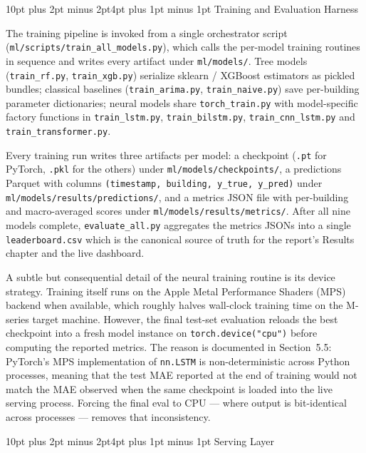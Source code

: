 \documentclass[12pt,a4paper,openany]{report}
\makeatletter
\renewcommand{\section}{\@startsection{section}{1}{\z@}%
  {10pt plus 2pt minus 2pt}{4pt plus 1pt minus 1pt}%
  {\normalfont\normalsize\bfseries}}
\makeatother
\begin{document}
\section{Training and Evaluation Harness}

The training pipeline is invoked from a single orchestrator script (\texttt{ml/scripts/}\allowbreak\texttt{train\_all\_models.py}), which calls the per-model training routines in sequence and writes every artifact under \texttt{ml/models/}. Tree models (\texttt{train\_rf.py}, \texttt{train\_xgb.py}) serialize sklearn / XGBoost estimators as pickled bundles; classical baselines (\texttt{train\_arima.py}, \texttt{train\_naive.py}) save per-building parameter dictionaries; neural models share \texttt{torch\_train.py} with model-specific factory functions in \texttt{train\_lstm.py}, \texttt{train\_bilstm.py}, \texttt{train\_cnn\_lstm.py} and \texttt{train\_transformer.py}.

Every training run writes three artifacts per model: a checkpoint (\texttt{.pt} for PyTorch, \texttt{.pkl} for the others) under \texttt{ml/models/checkpoints/}, a predictions Parquet with columns \texttt{(timestamp, building, y\_true, y\_pred)} under \texttt{ml/models/results/predictions/}, and a metrics JSON file with per-building and macro-averaged scores under \texttt{ml/models/results/metrics/}. After all nine models complete, \texttt{evaluate\_all.py} aggregates the metrics JSONs into a single \texttt{leaderboard.csv} which is the canonical source of truth for the report's Results chapter and the live dashboard.

A subtle but consequential detail of the neural training routine is its device strategy. Training itself runs on the Apple Metal Performance Shaders (MPS) backend when available, which roughly halves wall-clock training time on the M-series target machine. However, the final test-set evaluation reloads the best checkpoint into a fresh model instance on \texttt{torch.device("cpu")} before computing the reported metrics. The reason is documented in Section~5.5: PyTorch's MPS implementation of \texttt{nn.LSTM} is non-deterministic across Python processes, meaning that the test MAE reported at the end of training would not match the MAE observed when the same checkpoint is loaded into the live serving process. Forcing the final eval to CPU --- where output is bit-identical across processes --- removes that inconsistency.

\section{Serving Layer}
\end{document}

